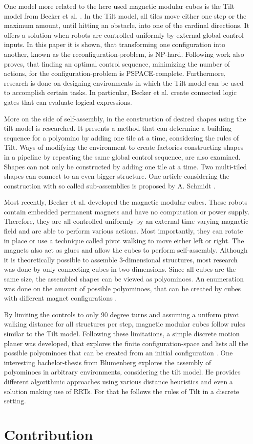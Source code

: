 One model more related to the here used magnetic modular cubes is the Tilt model from Becker et al. \cite{Becker2014_SP}.
In the Tilt model, all tiles move either one step or the maximum amount, until hitting an obstacle, into one of the cardinal directions.
It offers a solution when robots are controlled uniformly by external global control inputs.
In this paper it is shown, that transforming one configuration into another, known as the reconfiguration-problem, is NP-hard.
Following work \cite{Becker2014} also proves, that finding an optimal control sequence, minimizing the number of actions, for the configuration-problem is PSPACE-complete.
Furthermore, research is done on designing environments in which the Tilt model can be used to accomplish certain tasks.
In particular, Becker et al. \cite{Becker2014} create connected logic gates that can evaluate logical expressions.

More on the side of self-assembly, in \cite{Fekete2020} the construction of desired shapes using the tilt model is researched.
It presents a method that can determine a building sequence for a polyomino by adding one tile at a time, considering the rules of Tilt.
Ways of modifying the environment to create factories constructing shapes in a pipeline by repeating the same global control sequence, are also examined.
Shapes can not only be constructed by adding one tile at a time.
Two multi-tiled shapes can connect to an even bigger structure.
One article considering the construction with so called sub-assemblies is proposed by A. Schmidt \cite{Schmidt2018}.

Most recently, Becker et al. \cite{Becker2022} developed the magnetic modular cubes.
These robots contain embedded permanent magnets and have no computation or power supply.
Therefore, they are all controlled uniformly by an external time-varying magnetic field and are able to perform various actions.
Most importantly, they can rotate in place or use a technique called pivot walking to move either left or right.
The magnets also act as glues and allow the cubes to perform self-assembly.
Although it is theoretically possible to assemble 3-dimensional structures, most research was done by only connecting cubes in two dimensions.
Since all cubes are the same size, the assembled shapes can be viewed as polyominoes.
An enumeration was done on the amount of possible polyominoes, that can be created by cubes with different magnet configurations \cite{Becker2021}.

By limiting the controls to only 90 degree turns and assuming a uniform pivot walking distance for all structures per step, magnetic modular cubes follow rules similar to the Tilt model.
Following these limitations, a simple discrete motion planer was developed, that explores the finite configuration-space and lists all the possible polyominoes that can be created from an initial configuration \cite{Becker2022}.
One interesting bachelor-thesis from Blumenberg \cite{Blumenberg2022} explores the assembly of polyominoes in arbitrary environments, considering the tilt model.
He provides different algorithmic approaches using various distance heuristics and even a solution making use of RRTs.
For that he follows the rules of Tilt in a discrete setting.


\section{Contribution}
